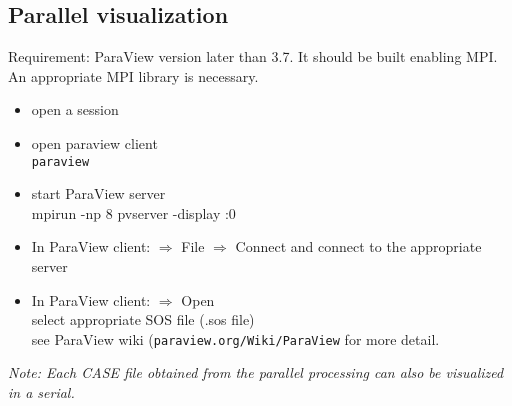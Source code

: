 \subsection{Parallel visualization}

Requirement: ParaView version later than 3.7. It should be built enabling MPI. An appropriate MPI library is necessary.

\begin{itemize}
\item open a session
\item open paraview client \\
\texttt{paraview}
\item start ParaView server \\
mpirun -np 8 pvserver -display :0
\item In ParaView client: $\Rightarrow$ File $\Rightarrow$ Connect and connect to the appropriate server
\item In ParaView client: $\Rightarrow$ Open\\
   select appropriate SOS file (.sos file)\\
   see ParaView wiki (\texttt{paraview.org/Wiki/ParaView} for more detail.
\end{itemize}

\emph{Note: Each CASE file obtained from the parallel processing can also be visualized in a serial.}


